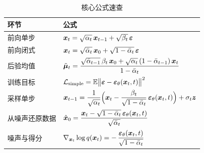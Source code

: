 \begin{table}[htbp]
  \centering
  \caption{核心公式速查}
  \label{tab:cheatsheet}
  \small
  \renewcommand{\arraystretch}{1.85}
  \setlength{\tabcolsep}{5pt}
  \begin{tabular}{@{}p{3.3cm} p{10.2cm}@{}}
    \toprule
    环节 & 公式 \\
    \midrule
    前向单步     & $\bm{x}_t=\sqrt{\alpha_t}\,\bm{x}_{t-1}+\sqrt{\beta_t}\,\bm{\varepsilon}$ \\
    前向闭式     & $\bm{x}_t=\sqrt{\bar{\alpha}_t}\,\bm{x}_0+\sqrt{1-\bar{\alpha}_t}\,\bm{\varepsilon}$ \\
    后验均值     & $\tilde{\bm{\mu}}_t=\dfrac{\sqrt{\bar\alpha_{t-1}}\,\beta_t\,\bm{x}_0+\sqrt{\alpha_t}\,(1-\bar\alpha_{t-1})\,\bm{x}_t}{1-\bar{\alpha}_t}$ \\
    训练目标     & $\mathcal{L}_{\text{simple}}=\mathbb{E}\bigl\|\bm{\varepsilon}-\bm{\varepsilon}_\theta(\bm{x}_t,t)\bigr\|^2$ \\
    采样单步     & $\bm{x}_{t-1}=\dfrac{1}{\sqrt{\alpha_t}}\Bigl(\bm{x}_t-\dfrac{\beta_t}{\sqrt{1-\bar{\alpha}_t}}\,\bm{\varepsilon}_\theta(\bm{x}_t,t)\Bigr)+\sigma_t\bm{z}$ \\
    从噪声还原数据 & $\hat{\bm{x}}_0=\dfrac{\bm{x}_t-\sqrt{1-\bar{\alpha}_t}\,\bm{\varepsilon}_\theta(\bm{x}_t,t)}{\sqrt{\bar{\alpha}_t}}$ \\
    噪声与得分   & $\nabla_{\bm{x}_t}\log q(\bm{x}_t)=-\,\dfrac{\bm{\varepsilon}_\theta(\bm{x}_t,t)}{\sqrt{1-\bar{\alpha}_t}}$ \\
    \bottomrule
  \end{tabular}
\end{table}
